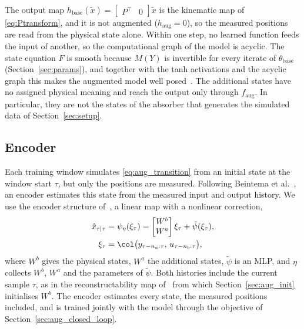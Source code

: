 The output map $h_{\mathrm{base}}(\tilde x)=\begin{bmatrix}P^\top &
0\end{bmatrix}\tilde x$ is the kinematic map of \eqref{eq:Ptransform}, and it
is not augmented ($h_{\mathrm{aug}}=0$), so the measured positions are read
from the physical state alone.
Within one step, no learned function feeds the input of another, so the
computational graph of the model is acyclic.
The state equation $F$ is smooth because $M(Y)$ is invertible for every
iterate of $\theta_{\mathrm{base}}$ (Section~\ref{sec:params}), and together
with the tanh activations and the acyclic graph this makes the augmented
model well posed~\cite[Thm.~9]{hoekstra2026lfr}.
The additional states have no assigned physical meaning and reach the output
only through $f_{\mathrm{aug}}$.
In particular, they are not the states of the absorber that generates the
simulated data of Section~\ref{sec:setup}.

\subsection{Encoder}\label{sec:aug_encoder}
Each training window simulates \eqref{eq:aug_transition} from an initial
state at the window start $\tau$, but only the positions are measured.
Following Beintema et al.~\cite{beintema2023subnet}, an encoder estimates
this state from the measured input and output history.
We use the encoder structure of~\cite[Eq.~(8)]{hoekstra2026encoder}, a
linear map with a nonlinear correction,
\begin{equation}
\begin{aligned}
 \hat x_{\tau|\tau}
 &=\psi_\eta(\xi_\tau)
 =\begin{bmatrix}W^b\\ W^a\end{bmatrix}\xi_\tau+\tilde\psi(\xi_\tau),\\
 \xi_\tau&=\col\bigl(y_{\tau-n_a:\tau},\,u_{\tau-n_b:\tau}\bigr),
\end{aligned}
 \label{eq:aug_encoder}
\end{equation}
where $W^b$ gives the physical states, $W^a$ the additional states,
$\tilde\psi$ is an MLP, and $\eta$ collects $W^b$, $W^a$ and the parameters
of $\tilde\psi$.
Both histories include the current sample $\tau$, as in the
reconstructability map of~\cite[Eq.~(15)]{hoekstra2026encoder} from which
Section~\ref{sec:aug_init} initialises $W^b$.
The encoder estimates every state, the measured positions included, and is
trained jointly with the model through the objective of
Section~\ref{sec:aug_closed_loop}.

